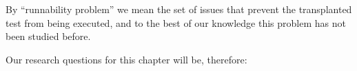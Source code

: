 By ``runnability problem'' we mean the set of issues that prevent the transplanted test from being executed, and to the best of our knowledge this problem has not been studied before.





Our research questions for this chapter will be, therefore:

